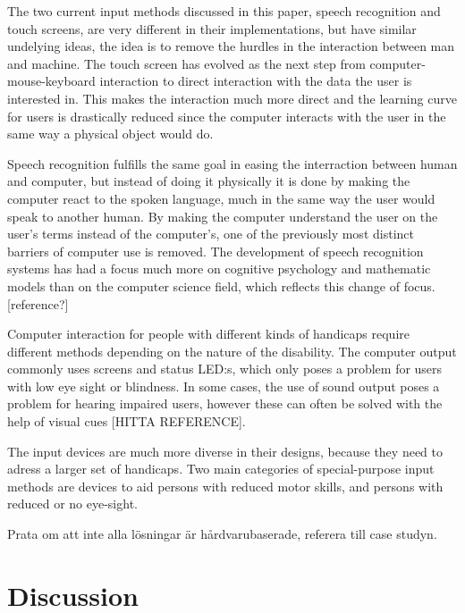 
The two current input methods discussed in this paper, speech recognition and touch screens, are very different in their implementations, but have similar undelying ideas, the idea is to remove the hurdles in the interaction between man and machine. The touch screen has evolved as the next step from computer-mouse-keyboard interaction to direct interaction with the data the user is interested in. This makes the interaction much more direct and the learning curve for users is drastically reduced since the computer interacts with the user in the same way a physical object would do.

Speech recognition fulfills the same goal in easing the interraction between human and computer, but instead of doing it physically it is done by making the computer react to the spoken language, much in the same way the user would speak to another human. By making the computer understand the user on the user's terms instead of the computer's, one of the previously most distinct barriers of computer use is removed. The development of speech recognition systems has had a focus much more on cognitive psychology and mathematic models than on the computer science field, which reflects this change of focus.[reference?]


Computer interaction for people with different kinds of handicaps require different methods depending on the nature of the disability. The computer output commonly uses screens and status LED:s, which only poses a problem for users with low eye sight or blindness. In some cases, the use of sound output poses a problem for hearing impaired users, however these can often be solved with the help of visual cues [HITTA REFERENCE]. 

The input devices are much more diverse in their designs, because they need to adress a larger set of handicaps. Two main categories of special-purpose input methods are devices to aid persons with reduced motor skills, and persons with reduced or no eye-sight.



Prata om att inte alla lösningar är hårdvarubaserade, referera till case studyn.

\section{Discussion}

